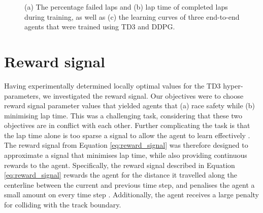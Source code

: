 \begin{figure}[htb!]
    \centering
    
    \caption[Learning curves showing for agents trained using TD3 and DDPG]{(a) The percentage failed laps and (b) lap time of completed laps during training, as well as (c) the learning curves of three end-to-end agents that were trained using TD3 and DDPG.}
    \label{fig:learning_method}
\end{figure}








\section{Reward signal}

Having experimentally determined locally optimal values for the TD3 hyper-parameters, we investigated the reward signal.
Our objectives were to choose reward signal parameter values that yielded agents that (a) race safety while (b) minimising lap time.
This was a challenging task, considering that these two objectives are in conflict with each other.
Further complicating the task is that the lap time alone is too sparse a signal to allow the agent to learn effectively \cite{Perot2017, Jaritz2018}.
The reward signal from Equation \ref{eq:reward_signal} was therefore designed to approximate a signal that minimises lap time, while also providing continuous rewards to the agent.
Specifically, the reward signal described in Equation \ref{eq:reward_signal} rewards the agent for the distance it travelled along the centerline between the current and previous time step, and penalises the agent a small amount on every time step \cite{Fuchs2021}. 
Additionally, the agent receives a large penalty for colliding with the track boundary. 

